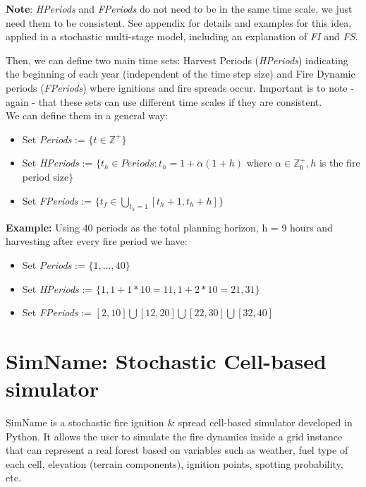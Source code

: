 \documentclass[11pt]{article}
\begin{document}
\textbf{Note}: \textit{HPeriods }and \textit{FPeriods }do not need to be in the same time scale, we just need them to be consistent. See appendix for details and examples for this idea, applied in a stochastic multi-stage model, including an explanation of \textit{FI} and \textit{FS}.

Then, we can define two main time sets: Harvest Periods (\textit{HPeriods}) indicating the beginning of each year (independent of the time step size) and Fire Dynamic periods (\textit{FPeriods}) where ignitions and fire spreads occur. Important is to note - again - that these sets can use different time scales if they are consistent.\\

\newpage
We can define them in a general way:
\begin{itemize}
	\item Set \textit{Periods }:= $\lbrace \textit{t} \in \mathbb{Z^{+}} \rbrace $
	\item Set \textit{HPeriods }:= $ \lbrace t_{h} \in Periods: t_{h} = 1 + \alpha(1+h)$  where $\alpha \in \mathbb{Z}^{+}_{0}, h$ is the fire period size$\rbrace$
	\item Set \textit{FPeriods }:= $\lbrace t_{f} \in \bigcup_{t_{h}=1} [t_{h}+1,t_{h}+h] \rbrace $
\end{itemize}

\textbf{Example:}
Using 40 periods as the total planning horizon, h = 9 hours and harvesting after every fire period we have:
\begin{itemize}
	\item Set \textit{Periods }:= $\lbrace 1,...,40\rbrace $
	\item Set \textit{HPeriods }:= $ \lbrace 1,1+1*10=11,1+2*10=21,31\rbrace$
	\item Set \textit{FPeriods }:= $[2,10] \bigcup [12,20] \bigcup [22,30] \bigcup [32,40] $
\end{itemize}

 



\section{SimName: Stochastic Cell-based simulator}
SimName is a stochastic fire ignition \& spread cell-based simulator developed in Python. It allows the user to simulate the fire dynamics inside a grid instance that can represent a real forest based on variables such as weather, fuel type of each cell, elevation (terrain components), ignition points, spotting probability, etc. \\
\end{document}
